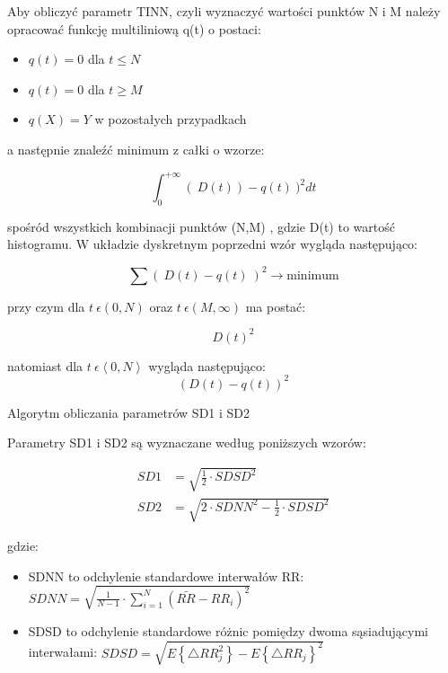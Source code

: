 \documentclass[a4paper, 11pt]{article}
\begin{document}
Aby obliczyć parametr TINN, czyli wyznaczyć wartości punktów N i M
należy opracować funkcję multiliniową q(t) o postaci:
\begin{itemize}
\item $q(t) = 0$ dla \ensuremath{t \le N}
\item $q(t) = 0$ dla \ensuremath{t \ge M} 
\item $q(X) = Y$ w pozostałych przypadkach
\end{itemize}
a następnie znaleźć minimum z całki o wzorze:

\begin{equation}
\int_{0}^{+\infty}\left(\: D(t)\right)-q(t)\:)^{2}dt
\end{equation}

spośród wszystkich kombinacji punktów (N,M) , gdzie D(t) to wartość
histogramu. W układzie dyskretnym poprzedni wzór wygląda następująco:

\begin{equation}
\sum(\: D(t)-q(t)\:)^{2}\rightarrow \text{minimum}
\end{equation}


przy czym dla $t\:\epsilon(0,N)$ oraz $t\:\epsilon(M,\infty)$ ma
postać: 

\begin{equation}
D(t)^{2}
\end{equation}


natomiast dla $t\:\epsilon\left\langle 0,N\right\rangle$ wygląda
następująco: 
\begin{equation}
(D(t)-q(t))^{2}
\end{equation}

Algorytm obliczania parametrów SD1 i SD2

Parametry SD1 i SD2 są wyznaczane według poniższych wzorów:

\begin{align}
SD1 &= \sqrt{\frac{1}{2}\cdot SDSD^{2}} \\
SD2 &= \sqrt{2\cdot SDNN^{2}-\frac{1}{2}\cdot SDSD^{2}}
\end{align}


gdzie:
\begin{itemize}
\item SDNN to odchylenie standardowe interwałów RR: $SDNN=\sqrt{\frac{1}{N-1}\cdot\sum_{i=1}^{N}\left(\bar{RR}-RR_{i}\right)^{2}}$
\item SDSD to odchylenie standardowe różnic pomiędzy dwoma sąsiadującymi
interwałami: $SDSD=\sqrt{E\left\{ \triangle RR_{j}^{2}\right\} -E\left\{ \triangle RR_{j}\right\} ^{2}}$
\end{itemize}
\end{document}
